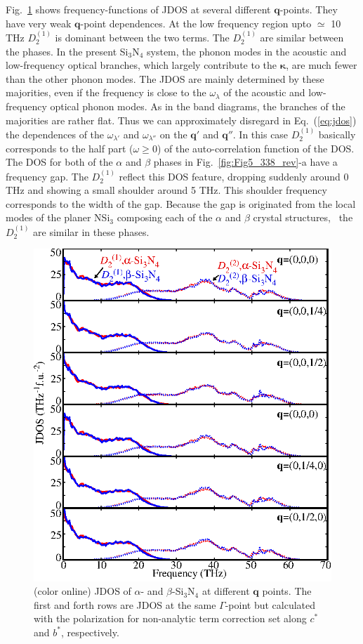 \documentclass[twocolumn,amsmath,amssymb,a4paper,prb,superscriptaddress,floatfix]{revtex4-1}
\begin{document}
Fig.~\ref{fig:Fig6_338} shows frequency-functions of JDOS at several different
$\mathbf{q}$-points. They have very weak $\mathbf{q}$-point dependences. At the
low frequency region upto $\simeq$ 10 THz $D_2^{(1)}$ is dominant between the
two terms. The $D_2^{(1)}$ are similar between the phases.  In the present
Si$_3$N$_4$ system, the phonon modes in the acoustic and low-frequency optical
branches, which largely contribute to the $\boldsymbol{\kappa}$, are much fewer
than the other phonon modes.  The JDOS are mainly determined by these
majorities, even if the frequency is close to the $\omega_\lambda$ of the
acoustic and low-frequency optical phonon modes. As in the band diagrams, the
branches of the majorities are rather flat. Thus we can approximately disregard
in Eq.~(\ref{eq:jdos}) the dependences of the $\omega_{\lambda'}$ and
$\omega_{\lambda''}$ on the $\mathbf{q}'$ and $\mathbf{q}''$.  In this case
$D_2^{(1)}$ basically corresponds to the half part ($\omega \geq  0$) of the
auto-correlation function of the DOS. The DOS for both of the $\alpha$ and
$\beta$ phases in Fig.~\ref{fig:Fig5_338_rev}-a have a frequency gap. The
$D_2^{(1)}$ reflect this DOS feature, dropping suddenly around 0 THz and showing
a small shoulder around 5 THz. This shoulder frequency corresponds to the width
of the gap.  Because the gap is originated from the local modes of the planer
NSi$_3$ composing each of the $\alpha$ and $\beta$ crystal
structures,~\cite{kuwabara} the $D_2^{(1)}$ are similar in these phases.  

\begin{figure}[ht]
 \centering
  \includegraphics[width=0.9\linewidth]{figure_jdoss.eps} \caption{(color
	  online) JDOS of $\alpha$- and $\beta$-Si$_3$N$_4$ at different $\mathbf q$ points.
  The first and forth rows are JDOS at the same $\Gamma$-point but calculated
  with the polarization for non-analytic term correction set along $c^*$ and
  $b^*$, respectively. \label{fig:Fig6_338} }
 \centering
\end{figure}
\end{document}
